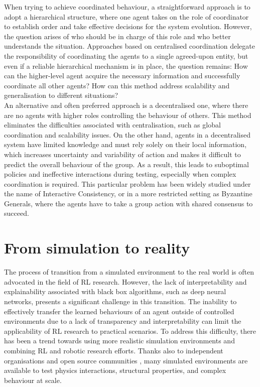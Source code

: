 \documentclass[a4paper,singleside,12pt]{report} %
\begin{document}
When trying to achieve coordinated behaviour, a straightforward approach is to adopt a hierarchical structure, where one agent takes on the role of coordinator to establish order and take effective decisions for the system evolution. However, the question arises of who should be in charge of this role and who better understands the situation. Approaches based on centralised coordination delegate the responsibility of coordinating the agents to a single agreed-upon entity, but even if a reliable hierarchical mechanism is in place, the question remains: How can the higher-level agent acquire the necessary information and successfully coordinate all other agents? How can this method address scalability and generalisation to different situations?\\
An alternative and often preferred approach is a decentralised one, where there are no agents with higher roles controlling the behaviour of others. This method eliminates the difficulties associated with centralisation, such as global coordination and scalability issues. On the other hand, agents in a decentralised system have limited knowledge and must rely solely on their local information, which increases uncertainty and variability of action and makes it difficult to predict the overall behaviour of the group. As a result, this leads to suboptimal policies and ineffective interactions during testing, especially when complex coordination is required. This particular problem has been widely studied under the name of Interactive Consistency, or in a more restricted setting as Byzantine Generals, where the agents have to take a group action with shared consensus to succeed.

\section{From simulation to reality}\label{into-the-real-world}
The process of transition from a simulated environment to the real world is often advocated in the field of RL research. However, the lack of interpretability and explainability associated with black box algorithms, such as deep neural networks, presents a significant challenge in this transition. The inability to effectively transfer the learned behaviours of an agent outside of controlled environments due to a lack of transparency and interpretability can limit the applicability of RL research to practical scenarios. To address this difficulty, there has been a trend towards using more realistic simulation environments and combining RL and robotic research efforts. Thanks also to independent organisations \cite{UnityML} and open source communities \cite{Farama}, many simulated environments are available to test physics interactions, structural properties, and complex behaviour at scale.
\end{document}

